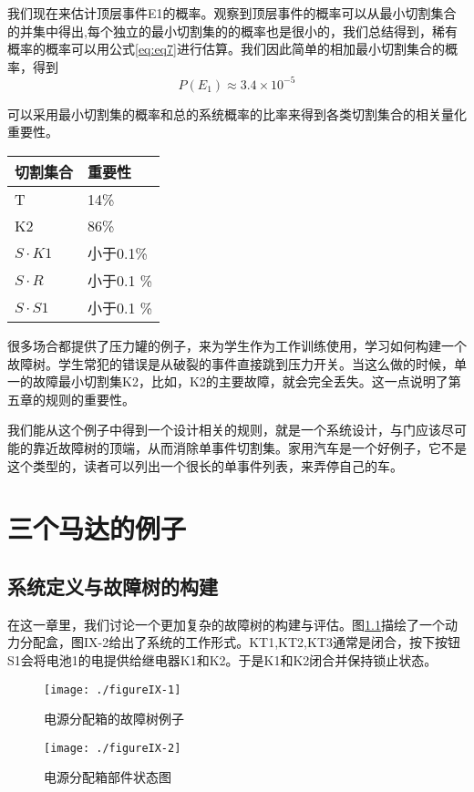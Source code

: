\documentclass[cn,11pt,chinese]{elegantbook}
\begin{document}
{我们现在来估计顶层事件E1的概率。观察到顶层事件的概率可以从最小切割集合的并集中得出,每个独立的最小切割集的的概率也是很小的，我们总结得到，稀有概率的概率可以用公式\ref{eq:eq7}进行估算。我们因此简单的相加最小切割集合的概率，得到
$$P(E_1) \approx 3.4 \times 10^{-5}$$

可以采用最小切割集的概率和总的系统概率的比率来得到各类切割集合的相关量化重要性。

\begin{table}
	\centering
	\begin{tabular}{l l}
		\toprule
		切割集合 & 重要性 \\ \midrule
		T &14\% \\
		K2 & 86\% \\
		$S\cdot K1$ & 小于0.1\% \\
		$S\cdot R$ &	小于0.1 \% \\
		$S\cdot S1$ & 	小于0.1 \% \\
	\end{tabular}
\end{table}

很多场合都提供了压力罐的例子，来为学生作为工作训练使用，学习如何构建一个故障树。学生常犯的错误是从破裂的事件直接跳到压力开关。当这么做的时候，单一的故障最小切割集K2，比如，K2的主要故障，就会完全丢失。这一点说明了第五章的规则的重要性。

我们能从这个例子中得到一个设计相关的规则，就是一个系统设计，与门应该尽可能的靠近故障树的顶端，从而消除单事件切割集。家用汽车是一个好例子，它不是这个类型的，读者可以列出一个很长的单事件列表，来弄停自己的车。

\chapter{三个马达的例子}
\section{系统定义与故障树的构建}

在这一章里，我们讨论一个更加复杂的故障树的构建与评估。图\ref{fig9-1}描绘了一个动力分配盒，图IX-2给出了系统的工作形式。KT1,KT2,KT3通常是闭合，按下按钮S1会将电池1的电提供给继电器K1和K2。于是K1和K2闭合并保持锁止状态。


\begin{figure}[H]
	\texttt{[image: ./figureIX-1]}
	\caption{电源分配箱的故障树例子}\label{fig9-1}
\end{figure}

\begin{figure}[H]
	\texttt{[image: ./figureIX-2]}
	\caption{电源分配箱部件状态图}\label{fig9-2}
\end{figure}

}
\end{document}
